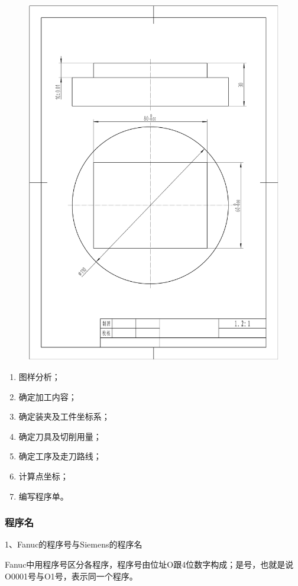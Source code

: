 \begin{figure}
    \centering
    \includegraphics[width=0.8\linewidth,trim=50 150 50 100,clip]{data/image/3-1.jpg}
    \caption{}
    \label{fig:3-1}
\end{figure}

\begin{enumerate}[1、]
    \item 图样分析；
    \item 确定加工内容；
    \item 确定装夹及工件坐标系；
    \item 确定刀具及切削用量；
    \item 确定工序及走刀路线；
    \item 计算点坐标；
    \item 编写程序单。
\end{enumerate}

\subsubsection{程序名}
1、Fanuc的程序号与Siemens的程序名

Fanuc中用程序号区分各程序，程序号由位址O跟4位数字构成；是号，也就是说O0001号与O1号，表示同一个程序。

